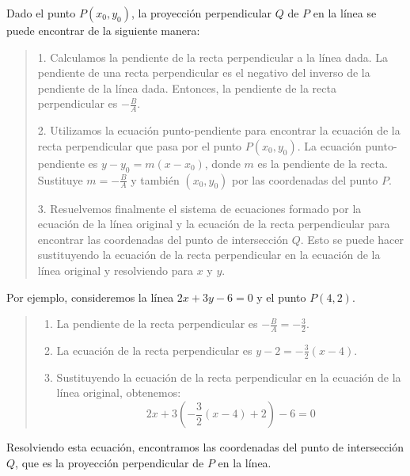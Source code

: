 \documentclass{article}
\begin{document}
   

Dado el punto $ P(x_0, y_0) $, la proyección perpendicular $ Q $ de $ P $ en la línea se puede encontrar de la siguiente manera:
\begin{quote}
1. Calculamos la pendiente de la recta perpendicular a la línea dada. 
La pendiente de una recta perpendicular es el negativo del inverso 
de la pendiente de la línea dada. 
Entonces, la pendiente de la recta perpendicular es $ -\frac{B}{A} $.

2. Utilizamos la ecuación punto-pendiente para encontrar la ecuación de la recta
 perpendicular que pasa por el punto $ P(x_0, y_0) $. 
 La ecuación punto-pendiente es $ y - y_0 = m(x - x_0) $, 
 donde $ m $ es la pendiente de la recta. 
 Sustituye $ m = -\frac{B}{A} $ y también $ (x_0, y_0) $ por las coordenadas del punto $ P $.

3. Resuelvemos finalmente el sistema de ecuaciones formado por la ecuación
 de la línea original y la ecuación de la recta perpendicular 
 para encontrar las coordenadas del punto de intersección $ Q $.
  Esto se puede hacer sustituyendo la ecuación de la recta perpendicular
   en la ecuación de la línea original y resolviendo para $ x $ y $ y $.
\end{quote}
Por ejemplo, consideremos la línea $ 2x + 3y - 6 = 0 $ y el punto $ P(4, 2) $.
\begin{quote}
\begin{enumerate}
\item  La pendiente de la recta perpendicular es $-\frac{B}{A} = -\frac{3}{2}$.
\item  La ecuación de la recta perpendicular es $ y - 2 = -\frac{3}{2}(x - 4) $.
\item Sustituyendo la ecuación de la recta perpendicular en la ecuación de la línea original, obtenemos:
\begin{equation} \label{eu_eqn}
2x + 3\left(-\frac{3}{2}(x - 4) + 2\right) - 6 = 0
\end{equation}
\end{enumerate}
\end{quote}
Resolviendo esta ecuación, encontramos las coordenadas del punto de intersección $ Q $, que es la proyección perpendicular de $ P $ en la línea.
\end{document}
